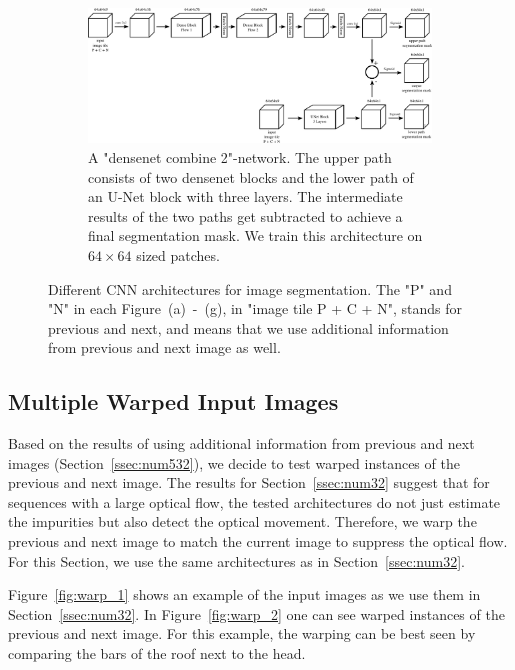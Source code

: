 	\begin{figure}[H]
  \ContinuedFloat
  \centering
				\begin{subfigure}{.95\textwidth}
		\centering
		\includegraphics[width=\linewidth]{models_flow/densenet_comb2.png}
	\caption[figure]{A "densenet combine 2"-network. The upper path consists of two densenet blocks and the lower path of an U-Net block with three layers. The intermediate results of the two paths get subtracted to achieve a final segmentation mask. We train this architecture on $64\times64$ sized patches.}
	\label{fig:flow_densenet_comb2}
	\end{subfigure}
	
	\caption[figure]{Different CNN architectures for image segmentation. The "P" and "N" in each Figure~(a)~-~(g), in "image tile P + C + N", stands for previous and next, and means that we use additional information from previous and next image as well. }
	\label{fig:flow_architecutes}
\end{figure}


\subsection{Multiple Warped Input Images}
\label{ssec:num33}

Based on the results of using additional information from previous and next images (Section~\ref{ssec:num532}), we decide to test warped instances of the previous and next image. The results for Section~\ref{ssec:num32} suggest that for sequences with a large optical flow, the tested architectures do not just estimate the impurities but also detect the optical movement. Therefore, we warp the previous and next image to match the current image to suppress the optical flow. For this Section, we use the same architectures as in Section~\ref{ssec:num32}. 

Figure~\ref{fig:warp_1} shows an example of the input images as we use them in Section~\ref{ssec:num32}. In Figure~\ref{fig:warp_2} one can see warped instances of the previous and next image. For this example, the warping can be best seen by comparing the bars of the roof next to the head.

